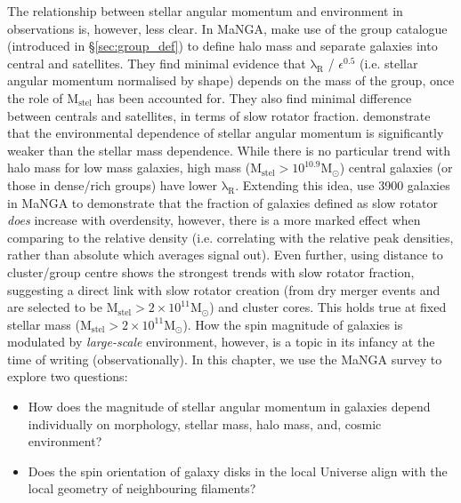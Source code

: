 The relationship between stellar angular momentum and environment in observations is, however, less clear. In MaNGA, \citet{greene2018} make use of the \citet{yang2007} group catalogue (introduced in \S\ref{sec:group_def}) to define halo mass and separate galaxies into central and satellites. They find minimal evidence that $\mathrm{\lambda_R}$ / $\epsilon^{0.5}$ (i.e. stellar angular momentum normalised by shape) depends on the mass of the group, once the role of $\mathrm{M_{stel}}$ has been accounted for. They also find minimal difference between centrals and satellites, in terms of slow rotator fraction. \citet{wang2020} demonstrate that the environmental dependence of stellar angular momentum is significantly weaker than the stellar mass dependence. While there is no particular trend with halo mass for low mass galaxies, high mass ($\mathrm{M_{stel} > 10^{10.9} M_{\odot}}$) central galaxies (or those in dense/rich groups) have lower $\mathrm{\lambda_R}$. Extending this idea, \citet{graham2019} use 3900 galaxies in MaNGA to demonstrate that the fraction of galaxies defined as slow rotator \textit{does} increase with overdensity, however, there is a more marked effect when comparing to the relative density (i.e. correlating with the relative peak densities, rather than absolute which averages signal out). Even further, using distance to cluster/group centre shows the strongest trends with slow rotator fraction, suggesting a direct link with slow rotator creation (from dry merger events and are selected to be $\mathrm{M_{stel} > 2\times10^{11} M_{\odot}}$) and cluster cores. This holds true at fixed stellar mass ($\mathrm{M_{stel} > 2\times10^{11} M_{\odot}}$). How the spin magnitude of galaxies is modulated by \textit{large-scale} environment, however, is a topic in its infancy at the time of writing (observationally). In this chapter, we use the MaNGA survey to explore two questions:

\begin{itemize}
    \item How does the magnitude of stellar angular momentum in galaxies depend individually on morphology, stellar mass, halo mass, and, cosmic environment?
    \item Does the spin orientation of galaxy disks in the local Universe align with the local geometry of neighbouring filaments?
\end{itemize}

